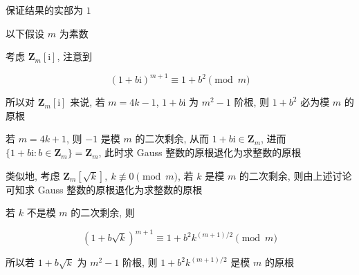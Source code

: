 保证结果的实部为 \(1\)

以下假设 \(m\) 为素数

考虑 \(\mathbf{Z}_m[\mathrm{i}]\), 注意到

\[
    \left(1+b\mathrm{i}\right)^{m+1}\equiv 1+b^2 \pmod m
\]

所以对 \(\mathbf{Z}_m[\mathrm{i}]\) 来说, 若 \(m=4k-1\), \(1+b\mathrm{i}\) 为 \(m^2-1\) 阶根, 则 \(1+b^2\) 必为模 \(m\) 的原根

若 \(m=4k+1\), 则 \(-1\) 是模 \(m\) 的二次剩余, 从而 \(1+b\mathrm{i}\in\mathbf{Z}_m\), 进而 \(\{1+b\mathrm{i}:b\in \mathbf{Z}_m\}=\mathbf{Z}_m\), 此时求 Gauss 整数的原根退化为求整数的原根

类似地, 考虑 \(\mathbf{Z}_m\left[\sqrt{k}\right],~k\not\equiv 0\pmod m\), 若 \(k\) 是模 \(m\) 的二次剩余, 则由上述讨论可知求 Gauss 整数的原根退化为求整数的原根

若 \(k\) 不是模 \(m\) 的二次剩余, 则

\[
    \left(1+b\sqrt{k}\right)^{m+1}\equiv 1+b^2 k^{(m+1)/2} \pmod m
\]

所以若 \(1+b\sqrt{k}\) 为 \(m^2-1\) 阶根, 则 \(1+b^2 k^{(m+1)/2}\) 是模 \(m\) 的原根
